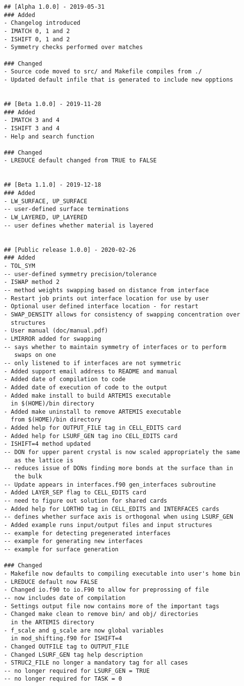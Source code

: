 \documentclass[12pt,a4paper,onecolumn,titlepage]{report}
\begin{document}
\begin{verbatim}
## [Alpha 1.0.0] - 2019-05-31
### Added
- Changelog introduced
- IMATCH 0, 1 and 2
- ISHIFT 0, 1 and 2
- Symmetry checks performed over matches

### Changed
- Source code moved to src/ and Makefile compiles from ./
- Updated default infile that is generated to include new opptions


## [Beta 1.0.0] - 2019-11-28
### Added
- IMATCH 3 and 4
- ISHIFT 3 and 4
- Help and search function

### Changed
- LREDUCE default changed from TRUE to FALSE


## [Beta 1.1.0] - 2019-12-18
### Added
- LW_SURFACE, UP_SURFACE
-- user-defined surface terminations
- LW_LAYERED, UP_LAYERED
-- user defines whether material is layered


## [Public release 1.0.0] - 2020-02-26
### Added
- TOL_SYM
-- user-defined symmetry precision/tolerance
- ISWAP method 2
-- method weights swapping based on distance from interface
- Restart job prints out interface location for use by user
- Optional user defined interface location - for restart
- SWAP_DENSITY allows for consistency of swapping concentration over
  structures
- User manual (doc/manual.pdf)
- LMIRROR added for swapping
-- says whether to maintain symmetry of interfaces or to perform 
   swaps on one
-- only listened to if interfaces are not symmetric
- Added support email address to README and manual
- Added date of compilation to code
- Added date of execution of code to the output
- Added make install to build ARTEMIS executable 
  in $(HOME)/bin directory
- Added make uninstall to remove ARTEMIS executable 
  from $(HOME)/bin directory
- Added help for OUTPUT_FILE tag in CELL_EDITS card
- Added help for LSURF_GEN tag ino CELL_EDITS card
- ISHIFT=4 method updated
-- DON for upper parent crystal is now scaled appropriately the same
   as the lattice is
-- reduces issue of DONs finding more bonds at the surface than in
   the bulk
-- Update appears in interfaces.f90 gen_interfaces subroutine
- Added LAYER_SEP flag to CELL_EDITS card
-- need to figure out solution for shared cards
- Added help for LORTHO tag in CELL_EDITS and INTERFACES cards
-- defines whether surface axis is orthogonal when using LSURF_GEN
- Added example runs input/output files and input structures
-- example for detecting pregenerated interfaces
-- example for generating new interfaces
-- example for surface generation

### Changed
- Makefile now defaults to compiling executable into user's home bin
- LREDUCE default now FALSE
- Changed io.f90 to io.F90 to allow for preprossing of file
-- now includes date of compilation
- Settings output file now contains more of the important tags
- Changed make clean to remove bin/ and obj/ directories 
  in the ARTEMIS directory
- f_scale and g_scale are now global variables
  in mod_shifting.f90 for ISHIFT=4
- Changed OUTFILE tag to OUTPUT_FILE
- Changed LSURF_GEN tag help description
- STRUC2_FILE no longer a mandatory tag for all cases
-- no longer required for LSURF_GEN = TRUE
-- no longer required for TASK = 0


\end{verbatim}
\end{document}
